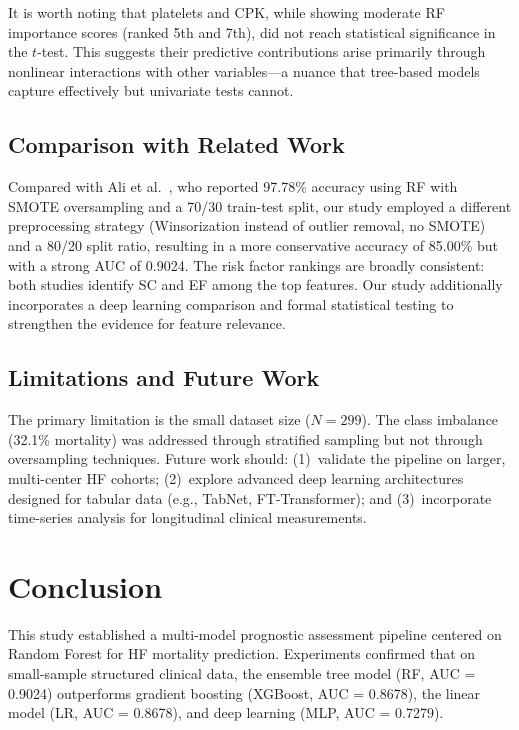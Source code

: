 \documentclass[12pt,a4paper]{article}
\begin{document}
It is worth noting that platelets and CPK, while showing moderate RF importance scores (ranked 5th and 7th), did not reach statistical significance in the $t$-test. This suggests their predictive contributions arise primarily through nonlinear interactions with other variables---a nuance that tree-based models capture effectively but univariate tests cannot.

\subsection{Comparison with Related Work}

Compared with Ali et al.\ \citep{ali2023ml}, who reported 97.78\% accuracy using RF with SMOTE oversampling and a 70/30 train-test split, our study employed a different preprocessing strategy (Winsorization instead of outlier removal, no SMOTE) and a 80/20 split ratio, resulting in a more conservative accuracy of 85.00\% but with a strong AUC of 0.9024. The risk factor rankings are broadly consistent: both studies identify SC and EF among the top features. Our study additionally incorporates a deep learning comparison and formal statistical testing to strengthen the evidence for feature relevance.

\subsection{Limitations and Future Work}

The primary limitation is the small dataset size ($N=299$). The class imbalance (32.1\% mortality) was addressed through stratified sampling but not through oversampling techniques. Future work should: (1)~validate the pipeline on larger, multi-center HF cohorts; (2)~explore advanced deep learning architectures designed for tabular data (e.g., TabNet, FT-Transformer); and (3)~incorporate time-series analysis for longitudinal clinical measurements.

\section{Conclusion}
\label{sec:conclusion}

This study established a multi-model prognostic assessment pipeline centered on Random Forest for HF mortality prediction. Experiments confirmed that on small-sample structured clinical data, the ensemble tree model (RF, AUC = 0.9024) outperforms gradient boosting (XGBoost, AUC = 0.8678), the linear model (LR, AUC = 0.8678), and deep learning (MLP, AUC = 0.7279).
\end{document}
